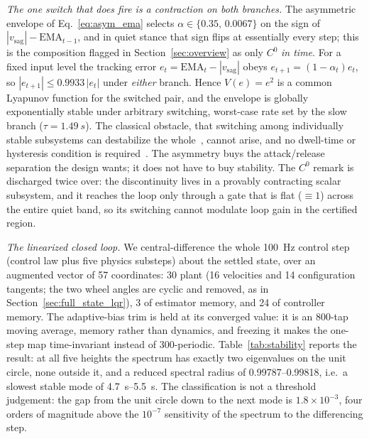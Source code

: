 \documentclass[a4paper,fleqn]{cas-dc}
\begin{document}
\emph{The one switch that does fire is a contraction on both branches.} The asymmetric envelope of Eq.~\eqref{eq:asym_ema} selects $\alpha\in\{0.35,\,0.0067\}$ on the sign of $|v_{\text{sag}}|-\mathrm{EMA}_{t-1}$, and in quiet stance that sign flips at essentially every step; this is the composition flagged in Section~\ref{sec:overview} as only $C^0$ \emph{in time}. For a fixed input level the tracking error $e_t=\mathrm{EMA}_t-|v_{\text{sag}}|$ obeys $e_{t+1}=(1-\alpha_t)e_t$, so $|e_{t+1}|\leq 0.9933\,|e_t|$ under \emph{either} branch. Hence $V(e)=e^2$ is a common Lyapunov function for the switched pair, and the envelope is globally exponentially stable under arbitrary switching, worst-case rate set by the slow branch ($\tau{=}\SI{1.49}{s}$). The classical obstacle, that switching among individually stable subsystems can destabilize the whole~\cite{liberzon2003switching}, cannot arise, and no dwell-time or hysteresis condition is required~\cite{hespanha2003hysteresis}. The asymmetry buys the attack/release separation the design wants; it does not have to buy stability. The $C^0$ remark is discharged twice over: the discontinuity lives in a provably contracting scalar subsystem, and it reaches the loop only through a gate that is flat ($\equiv 1$) across the entire quiet band, so its switching cannot modulate loop gain in the certified region.

\emph{The linearized closed loop.} We central-difference the whole \SI{100}{Hz} control step (control law plus five physics substeps) about the settled state, over an augmented vector of \num{57} coordinates: \num{30} plant (\num{16} velocities and \num{14} configuration tangents; the two wheel angles are cyclic and removed, as in Section~\ref{sec:full_state_lqr}), \num{3} of estimator memory, and \num{24} of controller memory. The adaptive-bias trim is held at its converged value: it is an \num{800}-tap moving average, memory rather than dynamics, and freezing it makes the one-step map time-invariant instead of \num{300}-periodic. Table~\ref{tab:stability} reports the result: at all five heights the spectrum has exactly two eigenvalues on the unit circle, none outside it, and a reduced spectral radius of \numrange{0.99787}{0.99818}, i.e.\ a slowest stable mode of \SIrange{4.7}{5.5}{s}. The classification is not a threshold judgement: the gap from the unit circle down to the next mode is $1.8{\times}10^{-3}$, four orders of magnitude above the $10^{-7}$ sensitivity of the spectrum to the differencing step.
\end{document}
